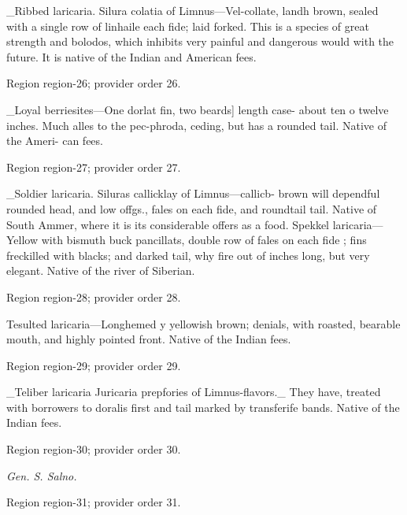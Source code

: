 \documentclass[11pt]{article}
\begin{document}
\_Ribbed laricaria. Silura colatia of Limnus—Vel-collate,
landh brown, sealed with a single row of linhaile each
fide; laid forked. This is a species of great strength
and bolodos, which inhibits very painful and dangerous
would with the future. It is native of the Indian
and American fees.
\par

{\scriptsize\color{gray} Region region-26; provider order 26.\par}
\medskip

\_Loyal berriesites—One dorlat fin, two beards] length case-
about ten o twelve inches. Much alles to the pec-phroda,
ceding, but has a rounded tail. Native of the Ameri-
can fees.
\par

{\scriptsize\color{gray} Region region-27; provider order 27.\par}
\medskip

\_Soldier laricaria. Siluras callicklay of Limnus—callicb-
brown will dependful rounded head, and low offgs.,
fales on each fide, and roundtail tail. Native of South
Ammer, where it is its considerable offers as a food.
Spekkel laricaria—Yellow with bismuth buck pancillats,
double row of fales on each fide ; fins freckilled with
blacks; and darked tail, why fire out of inches long,
but very elegant. Native of the river of Siberian.
\par

{\scriptsize\color{gray} Region region-28; provider order 28.\par}
\medskip

Tesulted laricaria—Longhemed y yellowish brown; denials,
with roasted, bearable mouth, and highly pointed
front. Native of the Indian fees.
\par

{\scriptsize\color{gray} Region region-29; provider order 29.\par}
\medskip

\_Teliber laricaria Juricaria prepfories of Limnus-flavors.\_
They have, treated with borrowers to doralis first and tail
marked by transferife bands. Native of the Indian fees.
\par

{\scriptsize\color{gray} Region region-30; provider order 30.\par}
\medskip

{\small\itshape Gen. S. Salno.\par}

{\scriptsize\color{gray} Region region-31; provider order 31.\par}
\medskip
\end{document}
